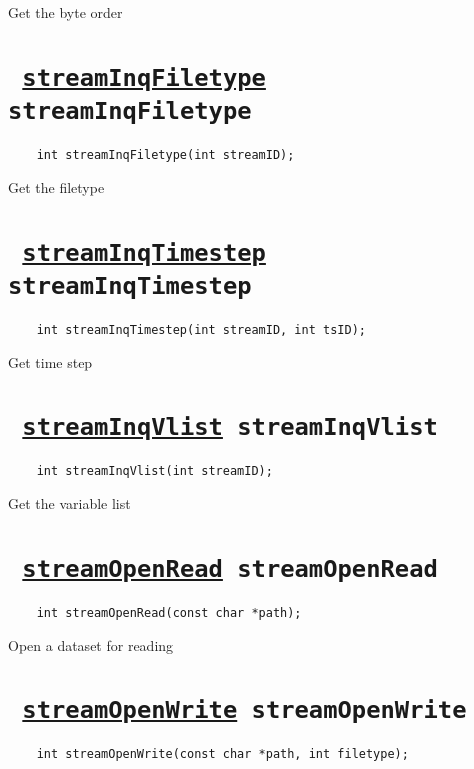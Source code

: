 Get the byte order
\ifpdfoutput{}{(\ref{streamInqByteorder})}


\section*{\tt 
\ifpdf
\hyperref[streamInqFiletype]{streamInqFiletype}
\else
streamInqFiletype
\fi
}
\begin{verbatim}
    int streamInqFiletype(int streamID);
\end{verbatim}

Get the filetype
\ifpdfoutput{}{(\ref{streamInqFiletype})}


\section*{\tt 
\ifpdf
\hyperref[streamInqTimestep]{streamInqTimestep}
\else
streamInqTimestep
\fi
}
\begin{verbatim}
    int streamInqTimestep(int streamID, int tsID);
\end{verbatim}

Get time step
\ifpdfoutput{}{(\ref{streamInqTimestep})}


\section*{\tt 
\ifpdf
\hyperref[streamInqVlist]{streamInqVlist}
\else
streamInqVlist
\fi
}
\begin{verbatim}
    int streamInqVlist(int streamID);
\end{verbatim}

Get the variable list
\ifpdfoutput{}{(\ref{streamInqVlist})}


\section*{\tt 
\ifpdf
\hyperref[streamOpenRead]{streamOpenRead}
\else
streamOpenRead
\fi
}
\begin{verbatim}
    int streamOpenRead(const char *path);
\end{verbatim}

Open a dataset for reading
\ifpdfoutput{}{(\ref{streamOpenRead})}


\section*{\tt 
\ifpdf
\hyperref[streamOpenWrite]{streamOpenWrite}
\else
streamOpenWrite
\fi
}
\begin{verbatim}
    int streamOpenWrite(const char *path, int filetype);
\end{verbatim}

